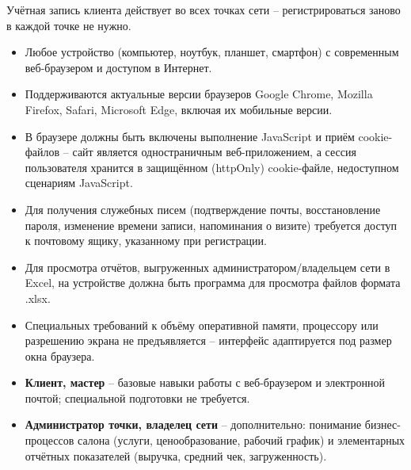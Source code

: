 Учётная запись клиента действует во всех точках сети -- регистрироваться
заново в каждой точке не нужно.



\begin{itemize}
  \item Любое устройство (компьютер, ноутбук, планшет, смартфон) с
        современным веб-браузером и доступом в Интернет.
  \item Поддерживаются актуальные версии браузеров Google Chrome, Mozilla
        Firefox, Safari, Microsoft Edge, включая их мобильные версии.
  \item В браузере должны быть включены выполнение JavaScript и приём
        cookie-файлов -- сайт является одностраничным веб-приложением, а
        сессия пользователя хранится в защищённом (httpOnly) cookie-файле,
        недоступном сценариям JavaScript.
  \item Для получения служебных писем (подтверждение почты, восстановление
        пароля, изменение времени записи, напоминания о визите) требуется
        доступ к почтовому ящику, указанному при регистрации.
  \item Для просмотра отчётов, выгруженных администратором/владельцем сети
        в Excel, на устройстве должна быть программа для просмотра файлов
        формата .xlsx.
  \item Специальных требований к объёму оперативной памяти, процессору или
        разрешению экрана не предъявляется -- интерфейс адаптируется под
        размер окна браузера.
\end{itemize}


\begin{itemize}
  \item \textbf{Клиент, мастер} -- базовые навыки работы с веб-браузером и
        электронной почтой; специальной подготовки не требуется.
  \item \textbf{Администратор точки, владелец сети} -- дополнительно:
        понимание бизнес-процессов салона (услуги, ценообразование,
        рабочий график) и элементарных отчётных показателей (выручка,
        средний чек, загруженность).
\end{itemize}

